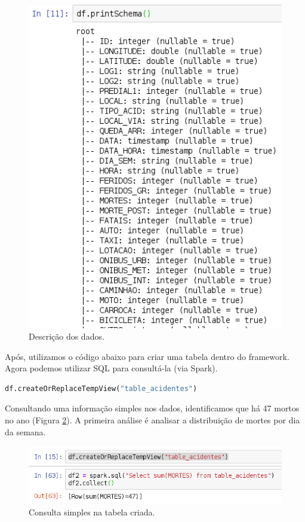 \documentclass{article}
\begin{document}
\begin{figure}[h]
  \includegraphics[width=\linewidth]{img/df_description.png}
  \caption{Descrição dos dados.}
  \label{fig:df_description}
\end{figure}

Após, utilizamos o código abaixo para criar uma tabela dentro do framework. Agora podemos utilizar SQL para consultá-la (via Spark).

\begin{lstlisting}[language=Python]
df.createOrReplaceTempView("table_acidentes")
\end{lstlisting}

Consultando uma informação simples nos dados, identificamos que há 47 mortos no ano (Figura \ref{fig:df_dead_no}). A primeira análise é analisar a distribuição de mortes por dia da semana.

\begin{figure}[h]
  \includegraphics[width=\linewidth]{img/df_numberofdead.png}
  \caption{Consulta simples na tabela criada.}
  \label{fig:df_dead_no}
\end{figure}
\end{document}
